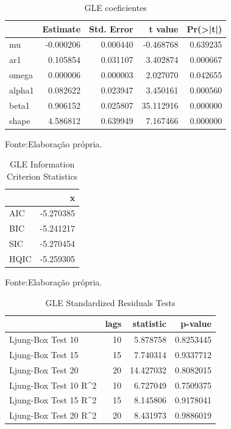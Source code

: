 \documentclass[
  12pt,
  a4paper,
  openany]{book}
\begin{document}
\begin{table}[!h]

\caption{\label{tab:unnamed-chunk-27}GLE coeficientes}
\centering
\begin{tabular}[t]{lrrrr}
\toprule
  &  Estimate &  Std. Error &  t value & Pr(>|t|)\\
\midrule
mu & -0.000206 & 0.000440 & -0.468768 & 0.639235\\
ar1 & 0.105854 & 0.031107 & 3.402874 & 0.000667\\
omega & 0.000006 & 0.000003 & 2.027070 & 0.042655\\
alpha1 & 0.082622 & 0.023947 & 3.450161 & 0.000560\\
beta1 & 0.906152 & 0.025807 & 35.112916 & 0.000000\\
\addlinespace
shape & 4.586812 & 0.639949 & 7.167466 & 0.000000\\
\bottomrule
\end{tabular}
\end{table}
\FloatBarrier
\centering

Fonte:Elaboração própria.

\justifying
\bigskip

\begin{table}[!h]

\caption{\label{tab:unnamed-chunk-28}GLE Information Criterion Statistics}
\centering
\begin{tabular}[t]{lr}
\toprule
  & x\\
\midrule
AIC & -5.270385\\
BIC & -5.241217\\
SIC & -5.270454\\
HQIC & -5.259305\\
\bottomrule
\end{tabular}
\end{table}
\FloatBarrier
\centering

Fonte:Elaboração própria.

\justifying
\bigskip

\begin{table}[!h]

\caption{\label{tab:unnamed-chunk-29}GLE Standardized Residuals Tests}
\centering
\begin{tabular}[t]{lrrr}
\toprule
  & lags & statistic & p-value\\
\midrule
Ljung-Box Test 10 & 10 & 5.878758 & 0.8253445\\
Ljung-Box Test 15 & 15 & 7.740314 & 0.9337712\\
Ljung-Box Test 20 & 20 & 14.427032 & 0.8082015\\
Ljung-Box Test 10 R\textasciicircum{}2 & 10 & 6.727049 & 0.7509375\\
Ljung-Box Test 15 R\textasciicircum{}2 & 15 & 8.145806 & 0.9178041\\
\addlinespace
Ljung-Box Test 20 R\textasciicircum{}2 & 20 & 8.431973 & 0.9886019\\
\bottomrule
\end{tabular}
\end{table}
\FloatBarrier
\centering
\end{document}
